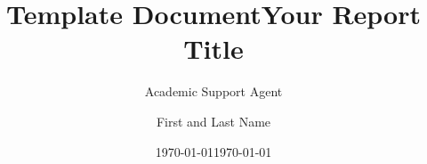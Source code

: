\documentclass{article}
\title{Template Document}
\author{Academic Support Agent}
\date{\today}
\begin{document}
\maketitle

\title{Your Report Title} %
\author{First and Last Name}
\date{\today} %
\maketitle %




\begin{abstract}
\normalsize
\lipsum[9]

\end{abstract}

\setcounter{tocdepth}{2}

















{}
\end{document}
